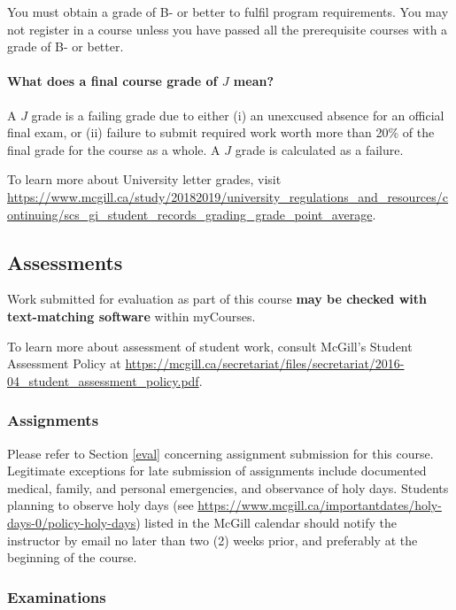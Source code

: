 \documentclass{article}
\begin{document}
You must obtain a grade of B- or better to fulfil program
requirements. You may not register in a course unless you have passed
all the prerequisite courses with a grade of B- or better.

\paragraph{What does a final course grade of $J$ mean?}

A $J$ grade is a failing grade due to either (i) an unexcused absence
for an official final exam, or (ii) failure to submit required work
worth more than 20\% of the final grade for the course as a whole. A
$J$ grade is calculated as a failure.

To learn more about University letter grades, visit
\url{https://www.mcgill.ca/study/20182019/university_regulations_and_resources/continuing/scs_gi_student_records_grading_grade_point_average}.

\subsection{Assessments}

Work submitted for evaluation as part of this course {\bf may be
  checked with text-matching software} within myCourses.

To learn more about assessment of student work, consult McGill's
Student Assessment Policy at
\url{https://mcgill.ca/secretariat/files/secretariat/2016-04_student_assessment_policy.pdf}.


\subsubsection{Assignments}

Please refer to Section \ref{eval} concerning assignment submission
for this course.  Legitimate exceptions for late submission of
assignments include documented medical, family, and personal
emergencies, and observance of holy days. Students planning to observe
holy days (see
\url{https://www.mcgill.ca/importantdates/holy-days-0/policy-holy-days})
listed in the McGill calendar should notify the instructor by email no
later than two (2) weeks prior, and preferably at the beginning of the
course.

\subsubsection{Examinations}
\end{document}
